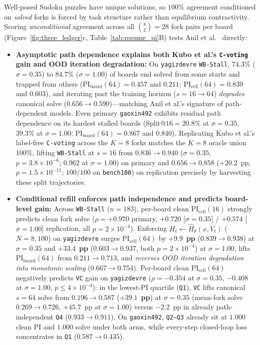 \documentclass[10pt,letterpaper]{article}
\begin{document}
Well-posed Sudoku puzzles have unique solutions, so $100\%$ agreement conditioned on \emph{solved} forks is forced by task structure rather than equilibrium contractivity. Scoring \emph{unconditional} agreement across all $\binom{8}{2}=28$ fork pairs per board (Figure~\ref{fig:three_ledger}c, Table~\ref{tab:resume_pi}B) tests Anil et al.\ \cite{anil2022path} directly:
\begin{itemize}
  \item \textbf{Asymptotic path dependence explains both Kubo et al.'s \texttt{C-voting} gain and OOD iteration degradation:} On \texttt{yagizdevre} \texttt{WB-Stall}, $74.3\%$ ($\sigma=0.35$) to $84.7\%$ ($\sigma=1.00$) of boards end solved from some starts and trapped from others ($\mathrm{PI}_{\mathrm{board}}(64) = 0.457$ and $0.211$; $\mathrm{PI}_{\mathrm{cell}}(64) = 0.839$ and $0.603$), and iterating past the training horizon ($s=16 \to 64$) \emph{degrades} canonical solve ($0.656 \to 0.590$)—matching Anil et al.'s \cite{anil2022path} signature of path-dependent models. Even primary \texttt{gaoxin492} exhibits residual path dependence on its hardest stalled boards ($\mathrm{Split}@16 = 20.8\%$ at $\sigma=0.35$, $39.3\%$ at $\sigma=1.00$; $\mathrm{PI}_{\mathrm{board}}(64) = 0.867$ and $0.840$). Replicating Kubo et al.'s \cite{kubo2026cvoting} label-free \texttt{C-voting} across the $K=8$ forks matches the $K=8$ oracle union $100\%$, lifting \texttt{WB-Stall} at $s=16$ from $0.836 \to 0.940$ ($\sigma=0.35$, $p=3.8\times 10^{-6}$; $0.962$ at $\sigma=1.00$) on primary and $0.656 \to 0.858$ ($+20.2$~pp, $p=1.5\times 10^{-11}$; $100/100$ on \texttt{bench100}) on replication precisely by harvesting these split trajectories.
  \item \textbf{Conditional refill enforces path independence and predicts board-level gain:} Across \texttt{WB-Stall} ($n=183$), per-board clean $\mathrm{PI}_{\mathrm{cell}}(16)$ strongly predicts clean fork solve ($\rho = +0.970$ primary, $+0.720$ [$\sigma=0.35$] / $+0.574$ [$\sigma=1.00$] replication, all $p=2\times 10^{-4}$). Enforcing $H_t \leftarrow \hat{H}_\theta(x,V_t)$ ($N=8{,}100$) on \texttt{yagizdevre} surges $\mathrm{PI}_{\mathrm{cell}}(64)$ by $\mathbf{+9.9}$~\textbf{pp} ($0.839 \to 0.938$) at $\sigma=0.35$ and $\mathbf{+33.4}$~\textbf{pp} ($0.603 \to 0.937$, both $p=2\times 10^{-4}$) at $\sigma=1.00$, lifts $\mathrm{PI}_{\mathrm{board}}(64)$ from $0.211 \to 0.713$, and \emph{reverses OOD iteration degradation into monotonic scaling} ($0.667 \to 0.754$). Per-board clean $\mathrm{PI}_{\mathrm{cell}}(64)$ negatively predicts \texttt{VC} gain on \texttt{yagizdevre} ($\rho = -0.354$ at $\sigma=0.35$, $-0.408$ at $\sigma=1.00$, $p \le 4\times 10^{-4}$): in the lowest-PI quartile (\texttt{Q1}), \texttt{VC} lifts canonical $s=64$ solve from $\mathbf{0.196 \to 0.587}$ ($\mathbf{+39.1}$~\textbf{pp}) at $\sigma=0.35$ (mean-fork solve $0.269 \to 0.726$, $+45.7$~pp at $\sigma=1.00$) versus $-2.2$~pp in already path-independent \texttt{Q4} ($0.933 \to 0.911$). On \texttt{gaoxin492}, \texttt{Q2--Q3} already sit at $1.000$ clean PI and $1.000$ solve under both arms, while every-step closed-loop loss concentrates in \texttt{Q1} ($0.587 \to 0.435$).

\end{itemize}
\end{document}
